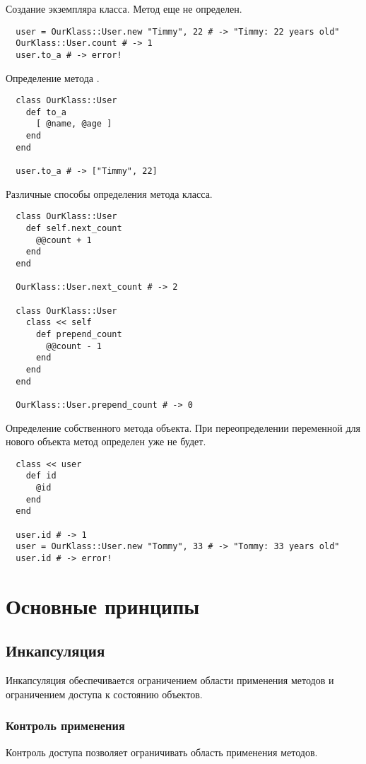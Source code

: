 Создание экземпляра класса. Метод  еще не определен.
\begin{verbatim}
  user = OurKlass::User.new "Timmy", 22 # -> "Timmy: 22 years old"
  OurKlass::User.count # -> 1
  user.to_a # -> error!
\end{verbatim}

Определение метода .
\begin{verbatim}
  class OurKlass::User
    def to_a
      [ @name, @age ]
    end
  end

  user.to_a # -> ["Timmy", 22]
\end{verbatim}

Различные способы определения метода класса.
\begin{verbatim}
  class OurKlass::User
    def self.next_count
      @@count + 1
    end
  end

  OurKlass::User.next_count # -> 2

  class OurKlass::User
    class << self
      def prepend_count
        @@count - 1
      end
    end
  end

  OurKlass::User.prepend_count # -> 0
\end{verbatim}

Определение собственного метода объекта. При переопределении переменной для нового объекта метод определен уже не будет.
\begin{verbatim}
  class << user
    def id
      @id
    end
  end

  user.id # -> 1
  user = OurKlass::User.new "Tommy", 33 # -> "Tommy: 33 years old"
  user.id # -> error!
\end{verbatim}

\section{Основные принципы}

\subsection{Инкапсуляция}

Инкапсуляция обеспечивается ограничением области применения методов и ограничением доступа к состоянию объектов.

\subsubsection*{Контроль применения}

Контроль доступа позволяет ограничивать область применения методов.

